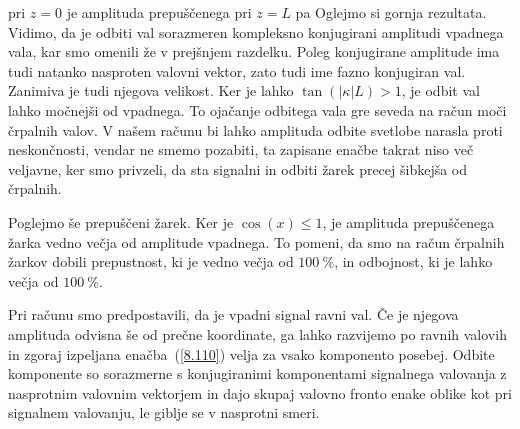 pri $z=0$ je 
amplituda prepuščenega pri $z = L$ pa
Oglejmo si gornja rezultata. Vidimo, da je odbiti val sorazmeren 
kompleksno konjugirani amplitudi vpadnega vala, kar smo omenili že v prejšnjem
razdelku. Poleg konjugirane amplitude ima tudi natanko nasproten valovni vektor, 
zato tudi ime fazno konjugiran val. Zanimiva je tudi njegova velikost. Ker 
je lahko $\tan\left(|\kappa|L\right)>1$, je odbit val lahko močnejši od vpadnega.
To ojačanje odbitega vala gre seveda na račun moči črpalnih
valov. V našem računu bi lahko amplituda odbite svetlobe narasla proti neskončnosti, 
vendar ne smemo pozabiti, ta zapisane enačbe takrat niso več veljavne, ker smo privzeli, 
da sta signalni in odbiti žarek precej šibkejša od črpalnih.

Poglejmo še prepuščeni žarek. Ker je $\cos(x)\leq1$, je amplituda prepuščenega
žarka vedno večja od amplitude vpadnega. To pomeni, da smo na račun črpalnih žarkov
dobili prepustnost, ki je vedno večja od $100~\%$, in odbojnost, ki je lahko 
večja od $100~\%$.

Pri računu smo predpostavili, da je vpadni signal ravni val. Če je njegova
amplituda odvisna še od prečne koordinate, ga lahko razvijemo po ravnih
valovih in zgoraj izpeljana enačba~(\ref{8.110}) velja za vsako komponento posebej. 
Odbite komponente so sorazmerne s konjugiranimi komponentami signalnega valovanja
z nasprotnim valovnim vektorjem in dajo skupaj valovno fronto enake
oblike kot pri signalnem valovanju, le giblje se v nasprotni smeri.